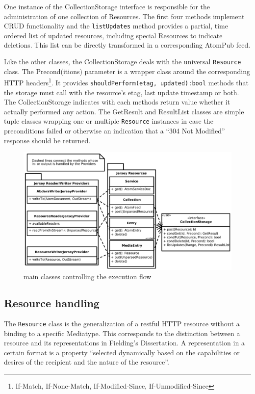 \documentclass[11pt,a4paper,headsepline,twoside]{scrartcl}		%
\begin{document}
One instance of the CollectionStorage interface is responsible for the
administration of one collection of Resources. The first four methods implement
CRUD functionality and the \lstinline:listUpdates: method provides a partial,
time ordered list of updated resources, including special Resources to indicate
deletions. This list can be directly transformed in a corresponding AtomPub
feed.

Like the other classes, the CollectionStorage deals with the universal
\lstinline:Resource: class. The Precond(itions) parameter is a wrapper class
around the corresponding HTTP headers\footnote{If-Match, If-None-Match,
  If-Modified-Since, If-Unmodified-Since}. It provides
\lstinline;shouldPerform(etag, updated):bool; methods that the storage must call
with the resource's etag, last update timestamp or both. The CollectionStorage
indicates with each methods return value whether it actually performed any
action. The GetResult and ResultList classes are simple tuple classes wrapping
one or multiple \lstinline:Resource: instances in case the preconditions failed
or otherwise an indication that a ``304 Not Modified'' response should be
returned.

\begin{figure}[htb]
  \advance\leftskip-1cm
  \includegraphics[width=1.2\textwidth]{executionflowoverview}

  \caption{main classes controlling the execution flow}
  \label{fig:executionflowoverview}
\end{figure}

\subsection{Resource handling}
\label{sec:resource-handling}

The \lstinline:Resource: class is the generalization of a restful HTTP resource
without a binding to a specific Mediatype. This corresponds to the distinction
between a resource and its representations in Fielding's
Dissertation\cite[sec. 5.2.1.1]{Fielding2000}. A representation in a certain
format is a property ``selected dynamically based on the capabilities or desires of
the recipient and the nature of the
resource''\cite[p. 87]{Fielding2000}.
\end{document}
